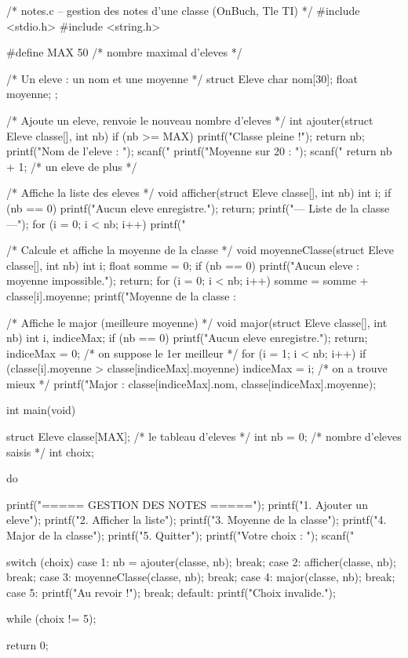 \begin{codec}
/* notes.c -- gestion des notes d'une classe (OnBuch, Tle TI) */
#include <stdio.h>
#include <string.h>

#define MAX 50   /* nombre maximal d'eleves */

/* Un eleve : un nom et une moyenne */
struct Eleve {
    char  nom[30];
    float moyenne;
};

/* Ajoute un eleve, renvoie le nouveau nombre d'eleves */
int ajouter(struct Eleve classe[], int nb) {
    if (nb >= MAX) {
        printf("Classe pleine !\n");
        return nb;
    }
    printf("Nom de l'eleve   : ");
    scanf("%
    printf("Moyenne sur 20   : ");
    scanf("%
    return nb + 1;   /* un eleve de plus */
}

/* Affiche la liste des eleves */
void afficher(struct Eleve classe[], int nb) {
    int i;
    if (nb == 0) {
        printf("Aucun eleve enregistre.\n");
        return;
    }
    printf("\n--- Liste de la classe ---\n");
    for (i = 0; i < nb; i++) {
        printf("%
    }
}

/* Calcule et affiche la moyenne de la classe */
void moyenneClasse(struct Eleve classe[], int nb) {
    int i;
    float somme = 0;
    if (nb == 0) {
        printf("Aucun eleve : moyenne impossible.\n");
        return;
    }
    for (i = 0; i < nb; i++) {
        somme = somme + classe[i].moyenne;
    }
    printf("Moyenne de la classe : %
}

/* Affiche le major (meilleure moyenne) */
void major(struct Eleve classe[], int nb) {
    int i, indiceMax;
    if (nb == 0) {
        printf("Aucun eleve enregistre.\n");
        return;
    }
    indiceMax = 0;                       /* on suppose le 1er meilleur */
    for (i = 1; i < nb; i++) {
        if (classe[i].moyenne > classe[indiceMax].moyenne) {
            indiceMax = i;               /* on a trouve mieux */
        }
    }
    printf("Major : %
           classe[indiceMax].nom, classe[indiceMax].moyenne);
}

int main(void) {
    struct Eleve classe[MAX];   /* le tableau d'eleves */
    int nb = 0;                 /* nombre d'eleves saisis */
    int choix;

    do {
        printf("\n===== GESTION DES NOTES =====\n");
        printf("1. Ajouter un eleve\n");
        printf("2. Afficher la liste\n");
        printf("3. Moyenne de la classe\n");
        printf("4. Major de la classe\n");
        printf("5. Quitter\n");
        printf("Votre choix : ");
        scanf("%

        switch (choix) {
            case 1: nb = ajouter(classe, nb);   break;
            case 2: afficher(classe, nb);       break;
            case 3: moyenneClasse(classe, nb);  break;
            case 4: major(classe, nb);          break;
            case 5: printf("Au revoir !\n");    break;
            default: printf("Choix invalide.\n");
        }
    } while (choix != 5);

    return 0;
}
\end{codec}

